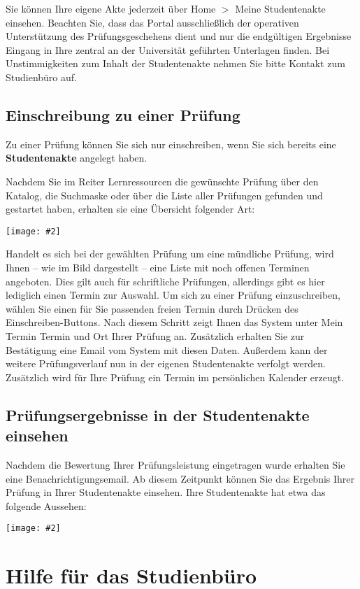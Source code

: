 \documentclass[a4paper,11pt]{article}
\newcommand{\bild}[2]{
    \begin{center}\texttt{[image: \#2]}\end{center}
}
\newcommand{\knopf}[1]{{\sc #1}}
\begin{document}
Sie können Ihre eigene Akte jederzeit über \knopf{Home $>$ Meine Studentenakte}
einsehen. Beachten Sie, dass das Portal ausschließlich der operativen
Unterstützung des Prüfungsgeschehens dient und nur die endgültigen Ergebnisse
Eingang in Ihre zentral an der Universität geführten Unterlagen finden. Bei
Unstimmigkeiten zum Inhalt der Studentenakte nehmen Sie bitte Kontakt zum Studienbüro
auf.

\subsection{Einschreibung zu einer Prüfung}

Zu einer Prüfung können Sie sich nur einschreiben, wenn Sie sich bereits eine
{\bf Studentenakte} angelegt haben.

Nachdem Sie im Reiter \knopf{Lernressourcen} die gewünschte Prüfung über den
Katalog, die Suchmaske oder über die Liste aller Prüfungen gefunden und
gestartet haben, erhalten sie eine Übersicht folgender Art:

\bild{1}{Pruefung-Einschreiben}

Handelt es sich bei der gewählten Prüfung um eine mündliche Prüfung, wird
Ihnen -- wie im Bild dargestellt -- eine Liste mit noch offenen Terminen
angeboten.  Dies gilt auch für schriftliche Prüfungen, allerdings gibt es hier
lediglich einen Termin zur Auswahl. Um sich zu einer Prüfung einzuschreiben,
wählen Sie einen für Sie passenden freien Termin durch Drücken des
\knopf{Einschreiben}-Buttons. Nach diesem Schritt zeigt Ihnen das System unter
\knopf{Mein Termin} Termin und Ort Ihrer Prüfung an. Zusätzlich erhalten Sie
zur Bestätigung eine Email vom System mit diesen Daten. Außerdem kann der
weitere Prüfungsverlauf nun in der eigenen Studentenakte verfolgt werden.
Zusätzlich wird für Ihre Prüfung ein Termin im persönlichen Kalender erzeugt.
 
\subsection{Prüfungsergebnisse in der Studentenakte einsehen}

Nachdem die Bewertung Ihrer Prüfungsleistung eingetragen wurde
erhalten Sie eine Benachrichtigungsemail. Ab diesem Zeitpunkt können Sie
das Ergebnis Ihrer Prüfung in Ihrer Studentenakte einsehen.  Ihre Studentenakte hat etwa
das folgende Aussehen:

\bild{1}{ESA-Ansicht}

\clearpage
\section{Hilfe für das Studienbüro}
\end{document}
